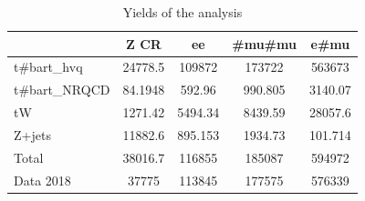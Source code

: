 \documentclass[10pt]{article}
\begin{document}
\begin{table}[htbp]
\begin{center}
\begin{tabular}{|l|S|S|S|S|}
\hline 
 & {Z CR} & {ee} & {#mu#mu} & {e#mu}\\
\hline 
  t#bar{t}_{hvq}   & 24778.5  & 109872  & 173722  & 563673  \\ 
  t#bar{t}_{NRQCD}   & 84.1948  & 592.96  & 990.805  & 3140.07  \\ 
  tW   & 1271.42  & 5494.34  & 8439.59  & 28057.6  \\ 
  Z+jets   & 11882.6  & 895.153  & 1934.73  & 101.714  \\ 
\hline 
  Total  & 38016.7  & 116855  & 185087  & 594972  \\ 
\hline 
  Data 2018   & 37775 & 113845 & 177575 & 576339 \\ 
\hline 
\end{tabular} 
\caption{Yields of the analysis} 
\end{center} 
\end{table} 
\end{document}
